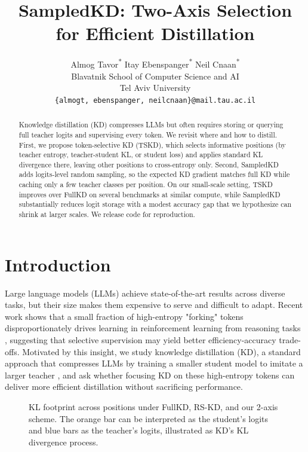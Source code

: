 \documentclass[11pt]{article}
\title{SampledKD: Two-Axis Selection for Efficient Distillation}
\author{
  Almog Tavor\textsuperscript{*} \qquad Itay Ebenspanger\textsuperscript{*} \qquad Neil Cnaan\textsuperscript{*} \\
  Blavatnik School of Computer Science and AI \\
  Tel Aviv University \\
  \texttt{\{almogt, ebenspanger, neilcnaan\}@mail.tau.ac.il} \\
}
\begin{document}
\maketitle
\let\thefootnote\relax
\footnotemark
{}
\begin{abstract}
	Knowledge distillation (KD) compresses LLMs but often requires storing or querying full teacher logits and supervising every token.
	We revisit where and how to distill.
	First, we propose token-selective KD (TSKD), which selects informative positions (by teacher entropy, teacher-student KL, or student loss) and applies standard KL divergence there, leaving other positions to cross-entropy only.
	Second, SampledKD adds logits-level random sampling, so the expected KD gradient matches full KD while caching only a few teacher classes per position.
	On our small-scale setting, TSKD improves over FullKD on several benchmarks at similar compute, while SampledKD substantially reduces logit storage with a modest accuracy gap that we hypothesize can shrink at larger scales.
	We release code for reproduction.
\end{abstract}

\section{Introduction}

Large language models (LLMs) achieve state-of-the-art results across diverse tasks, but their size makes them expensive to serve and difficult to adapt.
Recent work shows that a small fraction of high-entropy "forking" tokens disproportionately drives learning in reinforcement learning from reasoning tasks \citep{wang2025highentropy}, suggesting that selective supervision may yield better efficiency-accuracy trade-offs.
Motivated by this insight, we study knowledge distillation (KD), a standard approach that compresses LLMs by training a smaller student model to imitate a larger teacher \citep{hinton2015distillation}, and ask whether focusing KD on these high-entropy tokens can deliver more efficient distillation without sacrificing performance.

\begin{figure}[t!]
	\begin{flushright}
		\resizebox{\columnwidth}{!}{}
	\end{flushright}
	\caption{KL footprint across positions under FullKD, RS-KD, and our 2-axis scheme. The orange bar can be interpreted as the student's logits and blue bars as the teacher's logits, illustrated as KD's KL divergence process.}
	\label{fig:kd_intuition}
\end{figure}
\end{document}
